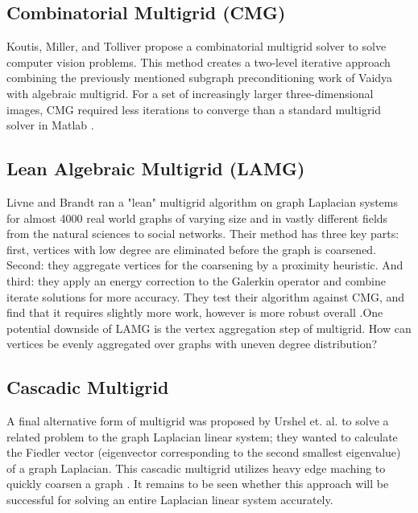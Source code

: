 \documentclass{article}
\begin{document}
\subsection{Combinatorial Multigrid (CMG)}
Koutis, Miller, and Tolliver propose a combinatorial multigrid solver to solve computer vision problems. This method creates a two-level iterative approach combining the previously mentioned subgraph preconditioning work of Vaidya with algebraic multigrid. For a set of increasingly larger three-dimensional images, CMG required less iterations to converge than a standard multigrid solver in Matlab \cite{Koutis:2011}.

\subsection{Lean Algebraic Multigrid (LAMG)}
Livne and Brandt ran a "lean" multigrid algorithm on graph Laplacian systems for almost 4000 real world graphs of varying size and in vastly different fields from the natural sciences to social networks. Their method has three key parts: first, vertices with low degree are eliminated before the graph is coarsened. Second: they aggregate vertices for the coarsening by a proximity heuristic. And third: they apply an energy correction to the Galerkin operator and combine iterate solutions for more accuracy. They test their algorithm against CMG, and find that it requires slightly more work, however is more robust overall \cite{Livne:2012}.One potential downside of LAMG is the vertex aggregation step of multigrid. How can vertices be evenly aggregated over graphs with uneven degree distribution?


\subsection{Cascadic Multigrid}
A final alternative form of multigrid was proposed by Urshel et. al. to solve a related problem to the graph Laplacian linear system; they wanted to calculate the Fiedler vector (eigenvector corresponding to the second smallest eigenvalue) of a graph Laplacian. This cascadic multigrid utilizes heavy edge maching to quickly coarsen a graph \cite{Urschel:2014}. It remains to be seen whether this approach will be successful for solving an entire Laplacian linear system accurately.
\end{document}
